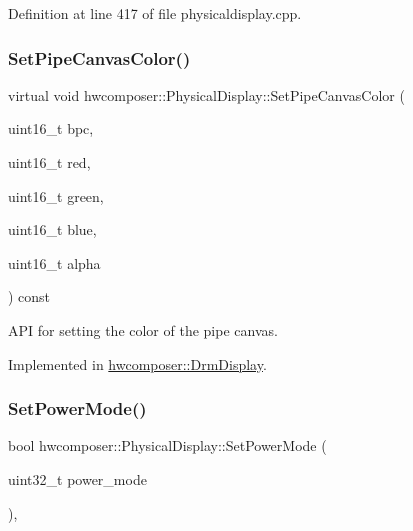 Definition at line 417 of file physicaldisplay.\+cpp.


\begin{DoxyCode}{0}
\end{DoxyCode}
\mbox{\label{classhwcomposer_1_1PhysicalDisplay_a3aeed39dd1af137ed16d83c4dfdcafad}} 
\subsubsection{\texorpdfstring{Set\+Pipe\+Canvas\+Color()}{SetPipeCanvasColor()}}
{\footnotesize\ttfamily virtual void hwcomposer\+::\+Physical\+Display\+::\+Set\+Pipe\+Canvas\+Color (\begin{DoxyParamCaption}\item[{uint16\+\_\+t}]{bpc,  }\item[{uint16\+\_\+t}]{red,  }\item[{uint16\+\_\+t}]{green,  }\item[{uint16\+\_\+t}]{blue,  }\item[{uint16\+\_\+t}]{alpha }\end{DoxyParamCaption}) const\hspace{0.3cm}{\ttfamily [pure virtual]}}

A\+PI for setting the color of the pipe canvas. 

Implemented in \mbox{\hyperlink{classhwcomposer_1_1DrmDisplay_aca6b6791dc9c5a4498895509e854bcfa}{hwcomposer\+::\+Drm\+Display}}.

\mbox{\label{classhwcomposer_1_1PhysicalDisplay_a4fc0fbe6c307de00cd10a3c998c74b51}} 
\subsubsection{\texorpdfstring{Set\+Power\+Mode()}{SetPowerMode()}}
{\footnotesize\ttfamily bool hwcomposer\+::\+Physical\+Display\+::\+Set\+Power\+Mode (\begin{DoxyParamCaption}\item[{uint32\+\_\+t}]{power\+\_\+mode }\end{DoxyParamCaption})\hspace{0.3cm}{\ttfamily [override]}, {\ttfamily [virtual]}}



